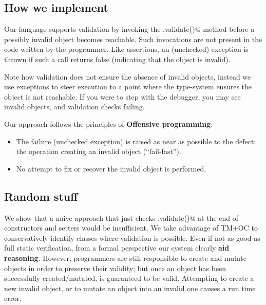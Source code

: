 \noindent 

\subsection{How we implement}
Our language supports validation by invoking the \Q@.validate()@ method before a possibly invalid object becomes reachable. Such invocations are not present in the code written by the programmer. 
Like assertions, an (unchecked) exception is thrown if such a call returns false (indicating that the object is invalid).

Note how validation does not ensure the absence of invalid objects, instead we use exceptions to steer execution to a point where the type-system ensures the object is not reachable.
If you were to step with the debugger, you may see invalid objects, and validation checks failing.

Our approach follows the principles of \textbf{Offensive programming}:
\begin{itemize}
\item The failure (unchecked exception)
is raised as near as possible to the defect: the operation creating an invalid object (``fail-fast'').
\item No attempt to fix or recover the invalid object is performed.
\end{itemize}

\subsection{Random stuff }
We show that a naive approach that just checks \Q@.validate()@ at the end of constructors and setters would be insufficient. We take advantage of TM+OC to conservatively identify classes where validation is possible.
%
Even if not as good as full static verification, from a formal perspective
 our system clearly \textbf{aid reasoning}.
However, programmers are still responsible to create and mutate objects in order to preserve their validity;
but once an object has been successfully created/mutated, is guaranteed to be valid.
Attempting to create a new invalid object, or to mutate an object into an invalid one causes
a run time error.

